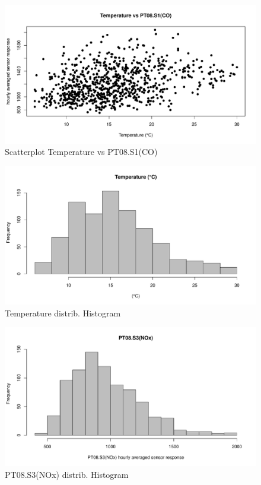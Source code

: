 \documentclass{article}
\begin{document}
\begin{figure}[H]
   \centering
   \includegraphics[width=\linewidth]{images/2_r.pdf}
   \caption{Scatterplot Temperature vs PT08.S1(CO)}
   \label{fig:fig13}
\end{figure}
\begin{figure}[H]
   \centering
   \includegraphics[width=\linewidth]{images/3_r.pdf}
   \caption{Temperature distrib. Histogram}
   \label{fig:fig14}
\end{figure}
\begin{figure}[H]
   \centering
   \includegraphics[width=\linewidth]{images/4_r.pdf}
   \caption{PT08.S3(NOx) distrib. Histogram}
   \label{fig:fig15}
\end{figure}
\end{document}
